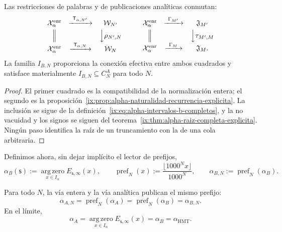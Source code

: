 \begin{proposition}
\label{ix:prop:alpha-cuadrados-compatibilidad}
Las restricciones de palabras y de publicaciones analíticas conmutan:
\[
\begin{array}{ccc}
 \mathcal X_\alpha^{\mathrm{enr}}&
 \xrightarrow{\ \mathsf T_{\alpha,N'}\ }&\mathcal W_{N'}\\[1mm]
 \Big\Vert&&\Big\downarrow\rho_{N',N}\\[1mm]
 \mathcal X_\alpha^{\mathrm{enr}}&
 \xrightarrow{\ \mathsf T_{\alpha,N}\ }&\mathcal W_N
\end{array}
\qquad
\begin{array}{ccc}
 \mathcal X_\alpha^{\mathrm{enr}}&
 \xrightarrow{\ \Gamma_{M'}\ }&\mathfrak J_{M'}\\[1mm]
 \Big\Vert&&\Big\downarrow\tau_{M',M}\\[1mm]
 \mathcal X_\alpha^{\mathrm{enr}}&
 \xrightarrow{\ \Gamma_M\ }&\mathfrak J_M .
\end{array}
\]
La familia \(I_{B,N}\) proporciona la conexión efectiva entre ambos
cuadrados y satisface materialmente
\(I_{B,N}\subseteq C_N^A\) para todo \(N\).
\end{proposition}

\begin{proof}
El primer cuadrado es la compatibilidad de la normalización entera; el segundo
es la proposición~\ref{ix:prop:alpha-naturalidad-recurrencia-explicita}. La
inclusión se sigue de la definición~\eqref{ix:eq:alpha-intervalos-b-completos},
y la no vacuidad y los signos se siguen del
teorema~\ref{ix:thm:alpha-raiz-completa-explicita}. Ningún paso identifica la
raíz de un truncamiento con la de una cola arbitraria.
\end{proof}

Definimos ahora, sin dejar implícito el lector de prefijos,
\begin{equation}
 \alpha_B(\mathsf s):=
 \operatorname*{arg\,zero}_{x\in I_\alpha}E_{\mathsf s,\infty}(x),
 \qquad
 \operatorname{pref}_N(x):=
 \frac{\lfloor1000^Nx\rfloor}{1000^N},
 \qquad
 \alpha_{B,N}:=\operatorname{pref}_N(\alpha_B).
 \label{ix:eq:alpha-definicion-b-y-prefijos-rev08}
\end{equation}

\begin{theorem}
\label{ix:prop:alpha-dos-limites}
Para todo \(N\), la vía entera y la vía analítica publican el mismo prefijo:
\begingroup
\renewcommand{\theequation}{A7\(_0\)}
\begin{equation}
 \boxed{\alpha_{A,N}=\operatorname{pref}_N(\alpha_A)
 =\operatorname{pref}_N(\alpha_B)=\alpha_{B,N}.}
 \label{ix:eq:alpha-dos-vias-cada-nivel}
\end{equation}
\endgroup
En el límite,
\begingroup
\renewcommand{\theequation}{A8\(_0\)}
\begin{equation}
 \boxed{\alpha_A
 =\operatorname*{arg\,zero}_{x\in I_\alpha}
       E_{\mathsf s,\infty}(x)
 =\alpha_B=\alpha_{\mathrm{HMT}}.}
 \label{ix:eq:alpha-dos-vias-limite-coinductivo}
\end{equation}
\endgroup
\end{theorem}

